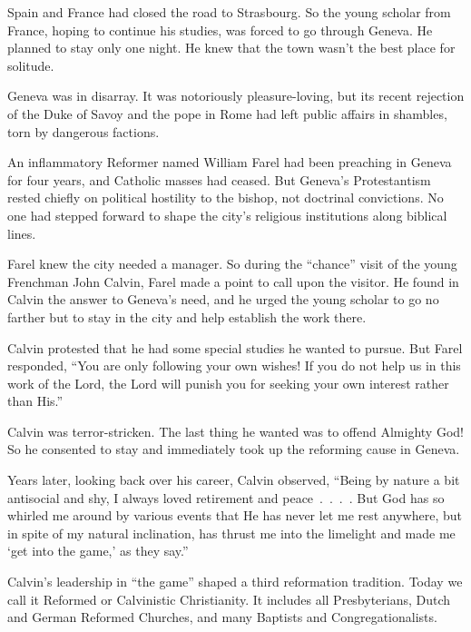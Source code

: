 
 Spain and France had closed the road to Strasbourg. So the young
scholar from France, hoping to continue his studies, was forced to go through Geneva. He planned to
stay only one night. He knew that the town wasn’t the best place for solitude.

Geneva was in disarray. It was notoriously pleasure-loving, but its recent rejection of the Duke of
Savoy and the pope in Rome had left public affairs in shambles, torn by dangerous factions.

An inflammatory Reformer named William Farel had been preaching in Geneva for four years, and
Catholic masses had ceased. But Geneva’s Protestantism rested chiefly on political hostility to the
bishop, not doctrinal convictions. No one had stepped forward to shape the city’s religious
institutions along biblical lines.

Farel knew the city needed a manager. So during the “chance” visit of the young Frenchman John
Calvin, Farel made a point to call upon the visitor. He found in Calvin the answer to Geneva’s need,
and he urged the young scholar to go no farther but to stay in the city and help establish the work
there.

Calvin protested that he had some special studies he wanted to pursue. But Farel responded, “You are
only following your own wishes! If you do not help us in this work of the Lord, the Lord will punish
you for seeking your own interest rather than His.”

Calvin was terror-stricken. The last thing he wanted was to offend Almighty God! So he consented to
stay and immediately took up the reforming cause in Geneva.

Years later, looking back over his career, Calvin observed, “Being by nature a bit antisocial and
shy, I always loved retirement and peace~.~.~.~. But God has so whirled me around by various events
that He has never let me rest anywhere, but in spite of my natural inclination, has thrust me into
the limelight and made me ‘get into the game,’ as they say.”

Calvin’s leadership in “the game” shaped a third reformation tradition. Today we call it Reformed or
Calvinistic Christianity. It includes all Presbyterians, Dutch and German Reformed Churches, and
many Baptists and Congregationalists.

